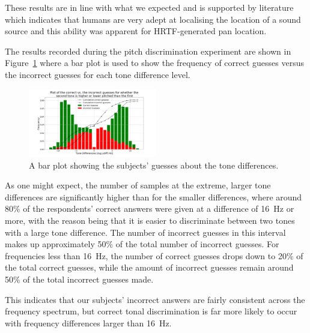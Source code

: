 \documentclass[format=sigconf, review=true, screen=true, anonymous=true]{acmart}
\begin{document}
These results are in line with what we expected and is supported by literature which indicates that humans are very adept at localising the location of a sound source and this ability was apparent for HRTF-generated pan location. 

The results recorded during the pitch discrimination experiment are shown in Figure~\ref{fig:tone-guesses} where a bar plot is used to show the frequency of correct guesses versus the incorrect guesses for each tone difference level. 

\begin{figure}
  \centering
  \includegraphics[width=0.5\textwidth]{figures/tone_guesses.png}
  \caption{A bar plot showing the subjects' guesses about the tone differences.}
  \label{fig:tone-guesses}
\end{figure}

As one might expect, the number of samples at the extreme, larger tone differences are significantly higher than for the smaller differences, where around 80\% of the respondents' correct answers were given at a difference of \SI{16}{\hertz} or more, with the reason being that it is easier to discriminate between two tones with a large tone difference. The number of incorrect guesses in this interval makes up approximately 50\% of the total number of incorrect guesses. For frequencies less than \SI{16}{\hertz}, the number of correct guesses drops down to 20\% of the total correct guesses, while the amount of incorrect guesses remain around 50\% of the total incorrect guesses made.

This indicates that our subjects' incorrect answers are fairly consistent across the frequency spectrum, but correct tonal discrimination is far more likely to occur with frequency differences larger than \SI{16}{\hertz}.  

\end{document}
